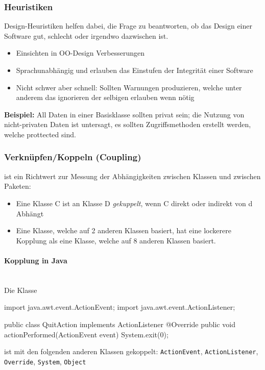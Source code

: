 \documentclass[ngerman,color=3b]{tuda_summary}
\begin{document}
\subsubsection{Heuristiken}
Design-Heuristiken helfen dabei, die Frage zu beantworten, ob das Design einer Software gut, schlecht oder irgendwo dazwischen ist.
\begin{itemize}
    \item Einsichten in OO-Design Verbesserungen
    \item Sprachunabhängig und erlauben das Einstufen der Integrität einer Software
    \item Nicht schwer aber schnell: Sollten Warnungen produzieren, welche unter anderem das ignorieren der selbigen erlauben wenn nötig
\end{itemize}

\textbf{Beispiel:} All Daten in einer Basisklasse sollten privat sein; die Nutzung von nicht-privaten Daten ist untersagt, es sollten Zugriffsmethoden erstellt werden, welche prottected sind.
\clearpage
\subsubsection{Verknüpfen/Koppeln (Coupling)}

\begin{definition}
    ist ein Richtwert zur Messung der Abhängigkeiten zwischen Klassen und zwischen Paketen:
    \begin{itemize}
        \item  Eine Klasse C ist an Klasse D \textit{gekuppelt}, wenn C direkt oder indirekt von d Abhängt
        \item  Eine Klasse, welche auf 2 anderen Klassen basiert, hat eine lockerere Kopplung als eine Klasse, welche auf 8 anderen Klassen basiert.
    \end{itemize}
\end{definition}

\paragraph{Kopplung in Java}\mbox{}\\
Die Klasse
\begin{codeBlock}[autogobble]{}
    import java.awt.event.ActionEvent;
    import java.awt.event.ActionListener;

    public class QuitAction implements ActionListener {
    	@Override
    	public void actionPerformed(ActionEvent event) {
    		System.exit(0);
    	}
    }
\end{codeBlock}
ist mit den folgenden anderen Klassen gekoppelt: \texttt{ActionEvent}, \texttt{ActionListener}, \texttt{Override}, \texttt{System}, \texttt{Object}
\end{document}
